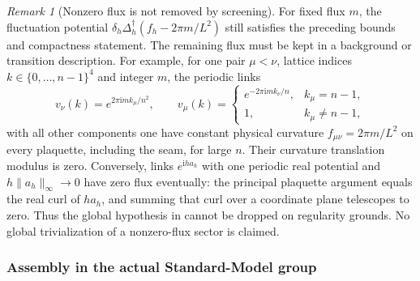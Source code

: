 \documentclass[11pt]{article}
\numberwithin{equation}{section}
\theoremstyle{definition}
\theoremstyle{remark}
\newtheorem{remark}[remark]{Remark}
\newcommand{\ii}{\mathrm i}
\newcommand{\norm}[1]{\lVert#1\rVert}
\begin{document}
\begin{remark}[Nonzero flux is not removed by screening]
\label{rem:determinant-nonzero-flux}
For fixed flux $m$, the fluctuation potential
$\delta_h\Delta_h^\dagger(f_h-2\pi m/L^2)$ still satisfies the preceding
bounds and compactness statement.  The remaining flux must be kept in a
background or transition description.  For example, for one pair
$\mu<\nu$, lattice indices $k\in\{0,\ldots,n-1\}^4$ and integer $m$, the
periodic links
\[
 v_\nu(k)=e^{2\pi\ii m k_\mu/n^2},\qquad
 v_\mu(k)=
 \begin{cases}
 e^{-2\pi\ii m k_\nu/n},&k_\mu=n-1,\\
 1,&k_\mu\ne n-1,
 \end{cases}
\]
with all other components one have constant physical curvature
$f_{\mu\nu}=2\pi m/L^2$ on every plaquette, including the seam, for large
$n$.  Their curvature translation modulus is zero.  Conversely, links
$e^{\ii h a_h}$ with one periodic real potential and
$h\norm{a_h}_\infty\to0$ have zero flux eventually: the principal
plaquette argument equals the real curl of $ha_h$, and summing that curl
over a coordinate plane telescopes to zero.  Thus the global hypothesis
in  cannot be dropped on regularity
grounds.  No global trivialization of a nonzero-flux sector is claimed.
\end{remark}

\subsubsection{Assembly in the actual Standard-Model group}
\end{document}
